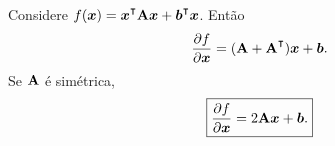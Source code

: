 \begin{theorem}
	Considere $f(\v{x}) = \v{x}\T\m{A}\v{x} + \v{b}\T\v{x}$. Então
	\begin{equation}
		\frac{\partial f}{\partial \v{x}} = (\m{A}+\m{A}\T)\v{x} + \v{b}.
	\end{equation}
	Se $\mathbf{A}$ é simétrica,
	\begin{equation}
		\boxed{\frac{\partial f}{\partial \bm{x}} = 2\mathbf{A}\bm{x} + \bm{b}.}
	\end{equation}
\end{theorem}